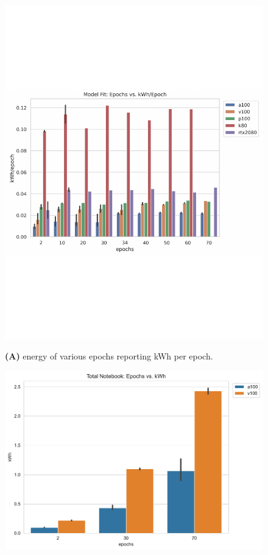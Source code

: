 \documentclass[utf8]{FrontiersinVancouver} %
\begin{document}
\begin{figure}[htb]

  \begin{center}

       \includegraphics[height=0.29\textheight]{images/energy_all_model_fit_kWh_per_epoch.pdf}

       {\bf (A)} energy of various epochs reporting kWh per epoch.
          
        \includegraphics[height=0.29\textheight]{images/total_epoch_vs_watts.pdf}


\end{center}
\end{figure}
\end{document}
